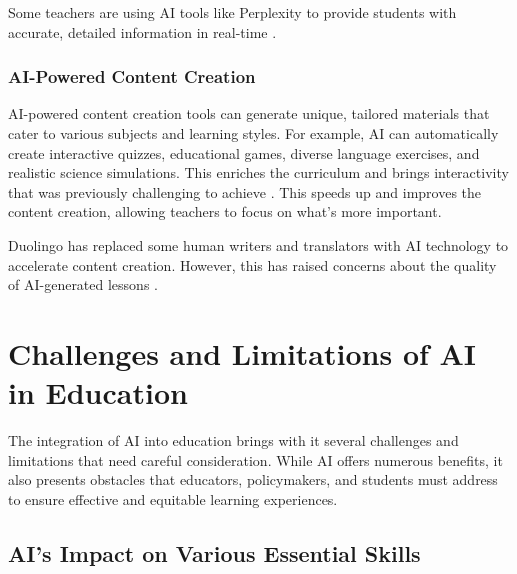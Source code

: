 \documentclass{article}
\begin{document}
Some teachers are using AI tools like Perplexity to provide students with accurate, detailed information in real-time \cite{https://www.tri-cityherald.com/news/local/education/article280745295.html} \cite{https://www.tri-cityherald.com/news/local/education/article280745295.html}.


\subsubsection{AI-Powered Content Creation}

AI-powered content creation tools can generate unique, tailored materials that cater to various subjects and learning styles. For example, AI can automatically create interactive quizzes, educational games, diverse language exercises, and realistic science simulations. This enriches the curriculum and brings interactivity that was previously challenging to achieve \cite{https://neurosys.com/blog/generative-ai-in-learning-and-education}. This speeds up and improves the content creation, allowing teachers to focus on what's more important.

Duolingo has replaced some human writers and translators with AI technology to accelerate content creation. However, this has raised concerns about the quality of AI-generated lessons \cite{https://www.baselinemag.com/artificial-intelligence-ai/duolingo-embraces-ai-the-impact-on-language-learning/} \cite{https://www.tomedes.com/translator-hub/ai-revolution-through-duolingo}.












\newpage

\section{Challenges and Limitations of AI in Education}

The integration of AI into education brings with it several challenges and limitations that need careful consideration. While AI offers numerous benefits, it also presents obstacles that educators, policymakers, and students must address to ensure effective and equitable learning experiences.

\subsection{AI's Impact on Various Essential Skills}
\end{document}
